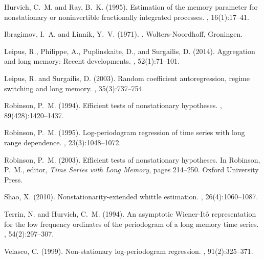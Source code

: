 \documentclass[10pt,a4paper]{amsart}
\numberwithin{equation}{section}
\begin{document}
\begin{thebibliography}{}
Hurvich, C.~M. and Ray, B.~K. (1995).
\newblock Estimation of the memory parameter for nonstationary or noninvertible
  fractionally integrated processes.
, 16(1):17--41.

Ibragimov, I.~A. and Linnik, Y.~V. (1971).
.
\newblock Wolters-Noordhoff, Groningen.

Leipus, R., Philippe, A., Puplinskaite, D., and Surgailis, D. (2014).
\newblock Aggregation and long memory: Recent developments.
, 52(1):71--101.

Leipus, R. and Surgailis, D. (2003).
\newblock Random coefficient autoregression, regime switching and long memory.
, 35(3):737--754.

Robinson, P.~M. (1994).
\newblock Efficient tests of nonstationary hypotheses.
,
  89(428):1420--1437.

Robinson, P.~M. (1995).
\newblock Log-periodogram regression of time series with long range dependence.
, 23(3):1048--1072.

Robinson, P.~M. (2003).
\newblock Efficient tests of nonstationary hypotheses.
\newblock In Robinson, P.~M., editor, {\em Time Series with Long Memory}, pages
  214--250. Oxford University Press.

Shao, X. (2010).
\newblock Nonstationarity-extended whittle estimation.
, 26(4):1060--1087.

Terrin, N. and Hurvich, C.~M. (1994).
\newblock An asymptotic {W}iener-{I}t\^{o} representation for the low frequency
  ordinates of the periodogram of a long memory time series.
, 54(2):297--307.

Velasco, C. (1999).
\newblock Non-stationary log-periodogram regression.
, 91(2):325--371.

\end{thebibliography}
\end{document}
